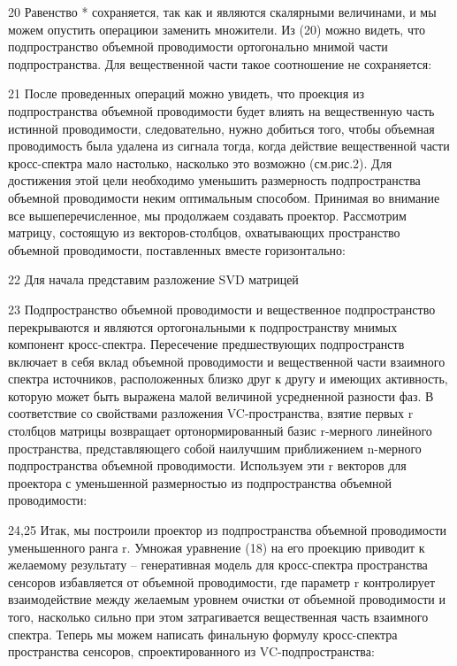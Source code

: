 20
Равенство * сохраняется, так как и являются скалярными величинами, и мы можем опустить операциюи заменить множители. Из (20) можно видеть, что подпространство объемной проводимости ортогонально мнимой части подпространства. Для вещественной части такое соотношение не сохраняется:

21
После проведенных операций можно увидеть, что проекция из подпространства объемной проводимости будет влиять на вещественную часть истинной проводимости, следовательно, нужно добиться того, чтобы объемная проводимость была удалена из сигнала тогда, когда действие вещественной части кросс-спектра мало настолько, насколько это возможно (см.рис.2). Для достижения этой цели необходимо уменьшить размерность подпространства объемной проводимости неким оптимальным способом.
Принимая во внимание все вышеперечисленное, мы продолжаем создавать проектор. Рассмотрим матрицу, состоящую из векторов-столбцов, охватывающих пространство объемной проводимости, поставленных вместе горизонтально:

22
Для начала представим разложение SVD матрицей 

23
Подпространство объемной проводимости и вещественное подпространство перекрываются и являются ортогональными к подпространству мнимых компонент кросс-спектра. Пересечение предшествующих подпространств включает в себя вклад объемной проводимости и вещественной части взаимного спектра источников, расположенных близко друг к другу и имеющих активность, которую может быть выражена малой величиной усредненной разности фаз. 
В соответствие со свойствами разложения VC-пространства, взятие первых r столбцов матрицы возвращает ортонормированный базис r-мерного линейного пространства, представляющего собой наилучшим приближением n-мерного подпространства объемной проводимости. Используем эти r векторов для проектора с уменьшенной размерностью из подпространства объемной проводимости:

24,25
Итак, мы построили проектор из подпространства объемной проводимости уменьшенного ранга r.
Умножая уравнение (18) на его проекцию приводит к желаемому результату – генеративная модель для кросс-спектра пространства сенсоров избавляется от объемной проводимости, где параметр r контролирует взаимодействие между желаемым уровнем очистки от объемной проводимости и того, насколько сильно при этом затрагивается вещественная часть взаимного спектра. Теперь мы можем написать финальную формулу кросс-спектра пространства сенсоров, спроектированного из VC-подпространства:

